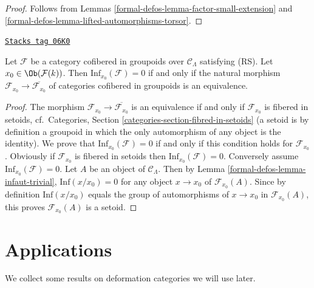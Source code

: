 \begin{proof}
Follows from
Lemmas \ref{formal-defos-lemma-factor-small-extension} and
\ref{formal-defos-lemma-lifted-automorphisms-torsor}.
\end{proof}

\begin{lemma}
\label{formal-defos-lemma-infdef-trivial}
\href{https://stacks.math.columbia.edu/tag/06K0}{\texttt{Stacks tag 06K0}}

Let $\mathcal{F}$ be a category cofibered in groupoids over
$\mathcal{C}_\Lambda$ satisfying (RS). Let
$x_0 \in \Ob(\mathcal{F}(k))$. Then $\text{Inf}_{x_0}(\mathcal{F}) = 0$
if and only if the natural morphism
$\mathcal{F}_{x_0} \to \overline{\mathcal{F}_{x_0}}$ of
categories cofibered in groupoids is an equivalence.
\end{lemma}

\begin{proof}
The morphism $\mathcal{F}_{x_0} \to \overline{\mathcal{F}_{x_0}}$ is an
equivalence if and only if $\mathcal{F}_{x_0}$ is fibered in setoids,
cf.\ Categories, Section \ref{categories-section-fibred-in-setoids}
(a setoid is by definition a groupoid in
which the only automorphism of any object is the identity). We prove that
$\text{Inf}_{x_0}(\mathcal{F}) = 0$ if and only if this condition holds
for $\mathcal{F}_{x_0}$.  Obviously if $\mathcal{F}_{x_0}$ is fibered in
setoids then $\text{Inf}_{x_0}(\mathcal{F}) = 0$.  Conversely assume
$\text{Inf}_{x_0}(\mathcal{F}) = 0$.  Let $A$ be an object of
$\mathcal{C}_\Lambda$. Then by
Lemma \ref{formal-defos-lemma-infaut-trivial},
$\text{Inf}(x/x_0) = 0$ for any object $x \to x_0$ of
$\mathcal{F}_{x_0}(A)$. Since by definition $\text{Inf}(x/x_0)$
equals the group of automorphisms of $x \to x_0$ in $\mathcal{F}_{x_0}(A)$,
this proves $\mathcal{F}_{x_0}(A)$ is a setoid.
\end{proof}

\section{Applications}
\label{formal-defos-section-applications}
We collect some results on deformation categories we will use later.

